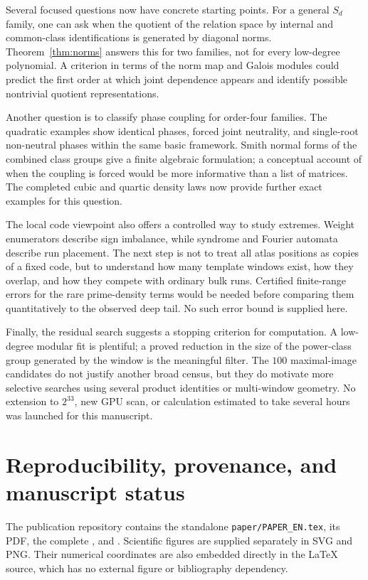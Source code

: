 \documentclass[11pt]{article}
\theoremstyle{definition}\newtheorem{definition}[theorem]{Definition}
\begin{document}
Several focused questions now have concrete starting points.
For a general $S_d$ family, one can ask when the quotient of the
relation space by internal and common-class identifications is
generated by diagonal norms. Theorem~\ref{thm:norms} answers this
for two families, not for every low-degree polynomial. A criterion
in terms of the norm map and Galois modules could predict the
first order at which joint dependence appears and identify
possible nontrivial quotient representations.

Another question is to classify phase coupling for order-four
families. The quadratic examples show identical phases, forced
joint neutrality, and single-root non-neutral phases within the
same basic framework. Smith normal forms of the combined class
groups give a finite algebraic formulation; a conceptual account
of when the coupling is forced would be more informative than a
list of matrices. The completed cubic and quartic density laws
now provide further exact examples for this question.

The local code viewpoint also offers a controlled way to study
extremes. Weight enumerators describe sign imbalance, while
syndrome and Fourier automata describe run placement. The next
step is not to treat all atlas positions as copies of a fixed
code, but to understand how many template windows exist, how
they overlap, and how they compete with ordinary bulk runs.
Certified finite-range errors for the rare prime-density terms
would be needed before comparing them quantitatively to the
observed deep tail. No such error bound is supplied here.

Finally, the residual search suggests a stopping criterion for
computation. A low-degree modular fit is plentiful; a proved
reduction in the size of the power-class group generated by the
window is the meaningful filter. The
$100$ maximal-image candidates do not justify another broad
census, but they do motivate more selective searches using
several product identities or multi-window geometry. No extension
to $2^{33}$, new GPU scan, or calculation estimated to take several
hours was launched for this manuscript.

\section{Reproducibility, provenance, and manuscript status}\label{sec:reproduction}
The publication repository contains the standalone
\texttt{paper/PAPER\_EN.tex}, its PDF, the complete
, and
. Scientific figures
are supplied separately in SVG and PNG. Their numerical
coordinates are also embedded directly in the LaTeX source,
which has no external figure or bibliography dependency.
\end{document}
